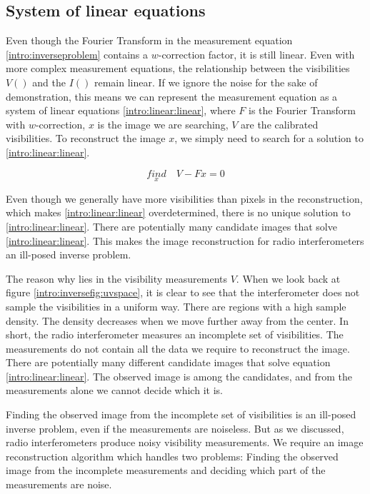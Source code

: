 \subsection{System of linear equations}
Even though the Fourier Transform in the measurement equation \eqref{intro:inverseproblem} contains a $w$-correction factor, it is still linear. Even with more complex measurement equations, the relationship between the visibilities $V()$ and the $I()$ remain linear\cite{smirnov2011revisiting}. If we ignore the noise for the sake of demonstration, this means we can represent the measurement equation as a system of linear equations  \eqref{intro:linear:linear}, where $F$ is the Fourier Transform with $w$-correction, $x$ is the image we are searching, $V$ are the calibrated visibilities. To reconstruct the image $x$, we simply need to search for a solution to \eqref{intro:linear:linear}.

\begin{equation}\label{intro:linear:linear}
\underset{x}{find}\quad V - Fx = 0
\end{equation}

Even though we generally have more visibilities than pixels in the reconstruction, which makes \eqref{intro:linear:linear} overdetermined, there is no unique solution to \eqref{intro:linear:linear}. There are potentially many candidate images that solve \eqref{intro:linear:linear}. This makes the image reconstruction for radio interferometers an ill-posed inverse problem. 

The reason why lies in the visibility measurements $V$. When we look back at figure \ref{intro:inversefig:uvspace}, it is clear to see that the interferometer does not sample the visibilities in a uniform way. There are regions with a high sample density. The density decreases when we move further away from the center. In short, the radio interferometer measures an incomplete set of visibilities. The measurements do not contain all the data we require to reconstruct the image. There are potentially many different candidate images that solve equation \eqref{intro:linear:linear}. The observed image is among the candidates, and from the measurements alone we cannot decide which it is. 

Finding the observed image from the incomplete set of visibilities is an ill-posed inverse problem, even if the measurements are noiseless. But as we discussed, radio interferometers produce noisy visibility measurements. We require an image reconstruction algorithm which handles two problems: Finding the observed image from the incomplete measurements and deciding which part of the measurements are noise. 

